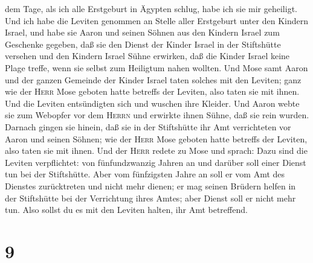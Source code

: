 dem Tage, als ich alle Erstgeburt in Ägypten schlug, habe ich sie mir
geheiligt.  Und ich habe die Leviten genommen an Stelle
aller Erstgeburt unter den Kindern Israel,  und habe sie
Aaron und seinen Söhnen aus den Kindern Israel zum Geschenke gegeben,
daß sie den Dienst der Kinder Israel in der Stiftshütte versehen und den
Kindern Israel Sühne erwirken, daß die Kinder Israel keine Plage treffe,
wenn sie selbst zum Heiligtum nahen wollten.  Und Mose
samt Aaron und der ganzen Gemeinde der Kinder Israel taten solches mit
den Leviten; ganz wie der \textsc{Herr} Mose geboten hatte betreffs der
Leviten, also taten sie mit ihnen.  Und die Leviten
entsündigten sich und wuschen ihre Kleider. Und Aaron webte sie zum
Webopfer vor dem \textsc{Herrn} und erwirkte ihnen Sühne, daß sie rein
wurden.  Darnach gingen sie hinein, daß sie in der
Stiftshütte ihr Amt verrichteten vor Aaron und seinen Söhnen; wie der
\textsc{Herr} Mose geboten hatte betreffs der Leviten, also taten sie
mit ihnen.  Und der \textsc{Herr} redete zu Mose und
sprach:  Dazu sind die Leviten verpflichtet: von
fünfundzwanzig Jahren an und darüber soll einer Dienst tun bei der
Stiftshütte.  Aber vom fünfzigsten Jahre an soll er vom
Amt des Dienstes zurücktreten und nicht mehr dienen;  er
mag seinen Brüdern helfen in der Stiftshütte bei der Verrichtung ihres
Amtes; aber Dienst soll er nicht mehr tun. Also sollst du es mit den
Leviten halten, ihr Amt betreffend.

\hypertarget{section-8}{%
\section{9}\label{section-8}}

